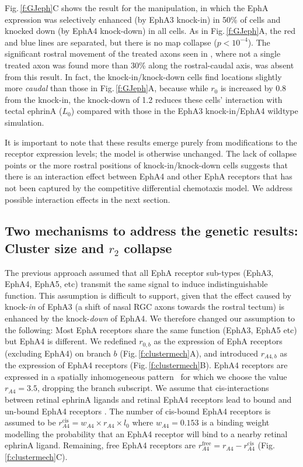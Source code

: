 \documentclass[9pt]{elife} %
\begin{document}
Fig.\,\ref{f:GJeph}C shows the result for the \citet{reber_relative_2004} manipulation, in which the EphA expression was selectively enhanced (by EphA3 knock-in) in 50\% of cells and knocked down (by EphA4 knock-down) in all cells.
As in Fig.\,\ref{f:GJeph}A, the red and blue lines are separated, but there is no map collapse ($p<10^{-4}$).
The significant rostral movement of the treated axons seen in \citet{reber_relative_2004}, where not a single treated axon was found more than 30\% along the rostral-caudal axis, was absent from this result.
In fact, the knock-in/knock-down cells find locations slightly more \emph{caudal} than those in Fig.\,\ref{f:GJeph}A, because while $r_0$ is increased by 0.8 from the knock-in, the knock-down of 1.2 reduces these cells' interaction with tectal ephrinA ($L_0$) compared with those in the EphA3 knock-in/EphA4 wildtype simulation.

It is important to note that these results emerge purely from modifications to the receptor expression levels; the model is otherwise unchanged.
The lack of collapse points or the more rostral positions of knock-in/knock-down cells suggests that there is an interaction effect between EphA4 and other EphA receptors that has not been captured by the competitive differential chemotaxis model.
We address possible interaction effects in the next section.

\subsection*{Two mechanisms to address the genetic results: Cluster size and $r_2$ collapse}

The previous approach assumed that all EphA receptor sub-types (EphA3, EphA4, EphA5, etc) transmit the same signal to induce indistinguishable function.
This assumption is difficult to support, given that the effect caused by knock-\emph{in} of EphA3 (a shift of nasal RGC axons towards the rostral tectum) is enhanced by the knock-\emph{down} of EphA4.
We therefore changed our assumption to the following: Most EphA receptors share the same function (EphA3, EphA5 etc) but EphA4 is different.
We redefined $r_{\!\scriptscriptstyle 0,b}$ as the expression of EphA receptors (excluding EphA4) on branch $b$ (Fig.\,\ref{f:clustermech}A), and introduced $r_{\!\scriptscriptstyle A4,b}$ as the expression of EphA4 receptors (Fig.\,\ref{f:clustermech}B). EphA4 receptors are expressed in a spatially inhomogeneous pattern~\citep{reber_relative_2004} for which we choose the value $r_{\!\scriptscriptstyle A4} = 3.5$, dropping the branch subscript.  We assume that cis-interactions between retinal ephrinA ligands and retinal EphA4 receptors lead to bound and un-bound EphA4 receptors \citep{hornberger_modulation_1999}. The number of cis-bound EphA4 receptors is assumed to be $r_{\!\scriptscriptstyle A4}^{\mathrm{cis}} = w_{\!\scriptscriptstyle A4} \times r_{\!\scriptscriptstyle A4} \times l_0$ where $w_{\!\scriptscriptstyle A4} = 0.153$ is a binding weight modelling the probability that an EphA4 receptor will bind to a nearby retinal ephrinA ligand. Remaining, free EphA4 receptors are $r_{\!\scriptscriptstyle A4}^{\mathrm{free}} = r_{\!\scriptscriptstyle A4} - r_{\!\scriptscriptstyle A4}^{\mathrm{cis}}$ (Fig.\,\ref{f:clustermech}C).
\end{document}
